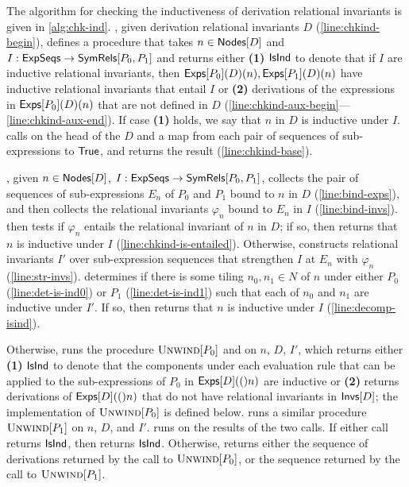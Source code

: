 %
The algorithm \chkinductive for checking the inductiveness of
derivation relational invariants is given in
\autoref{alg:chk-ind}.
%
\chkinductive, given derivation relational invariants $D$
(\autoref{line:chkind-begin}), defines a procedure \chkindaux that
takes $n \in \mathsf{Nodes}[ D ]$ and $I: \mathsf{ExpSeqs} \to \mathsf{SymRels}[ P_0, P_1 ]$
and returns either %
\textbf{(1)} $\mathsf{IsInd}$ to denote that if $I$ are inductive relational
invariants, then $\mathsf{Exps}[ P_0 ]( D )(n), \mathsf{Exps}[ P_1 ]( D )(n)$ have
inductive relational invariants that entail $I$ or
%
\textbf{(2)} derivations of the expressions in $\mathsf{Exps}[ P_0 ]( D )(n)$
that are not defined in $D$
(\autoref{line:chkind-aux-begin}---\autoref{line:chkind-aux-end}).
%
If case \textbf{(1)} holds, we say that $n$ in $D$ is inductive under
$I$.
%
\chkinductive calls \chkindaux on the head of the $D$ and a map from
each pair of sequences of sub-expressions to $\mathsf{True}$, and returns the
result (\autoref{line:chkind-base}).

\chkindaux, given $n \in \mathsf{Nodes}[ D ]$, $I : \mathsf{ExpSeqs} \to
\mathsf{SymRels}[ P_0, P_1 ]$, collects the pair of sequences of sub-expressions
$E_n$ of $P_0$ and $P_1$ bound to $n$ in $D$
(\autoref{line:bind-exps}), and then collects the relational
invariants $\varphi_n$ bound to $E_n$ in $I$
(\autoref{line:bind-invs}).
%
\chkindaux then tests if $\varphi_n$ entails the relational invariant
of $n$ in $D$;
% 
if so, then \chkindaux returns that $n$ is inductive under $I$
(\autoref{line:chkind-is-entailed}).
Otherwise, \chkindaux constructs relational invariants $I'$ over
sub-expression sequences that strengthen $I$ at $E_n$ with $\varphi_n$
(\autoref{line:str-invs}).
%
\chkindaux determines if there is some tiling $n_0, n_1 \in N$ of $n$
under either $P_0$ (\autoref{line:det-is-ind0}) or $P_1$
(\autoref{line:det-is-ind1}) such that each of $n_0$ and $n_1$ are
inductive under $I'$.
%
If so, then \chkindaux returns that $n$ is inductive under $I$
(\autoref{line:decomp-isind}).

Otherwise, \chkindaux runs the procedure $\textsc{Unwind}[ P_0 ]$ and on $n$,
$D$, $I'$, which returns either \textbf{(1)} $\mathsf{IsInd}$ to denote that
the components under each evaluation rule that can be applied to the
sub-expressions of $P_0$ in $\mathsf{Exps}[ D ]( ( )n)$ are inductive or %
\textbf{(2)} returns derivations of $\mathsf{Exps}[ D ]( ( )n)$ that do not have
relational invariants in $\mathsf{Invs}[ D ]$;
%
the implementation of $\textsc{Unwind}[ P_0 ]$ is defined below.
%
\chkindaux runs a similar procedure $\textsc{Unwind}[ P_1 ]$ on $n$, $D$, and
$I'$.
\chkindaux runs \chooseres on the results of the two calls.
%
If either call returns $\mathsf{IsInd}$, then \chooseres returns $\mathsf{IsInd}$.
%
Otherwise, \chooseres returns either the sequence of derivations
returned by the call to $\textsc{Unwind}[ P_0 ]$, or the sequence returned by
the call to $\textsc{Unwind}[ P_1 ]$.

